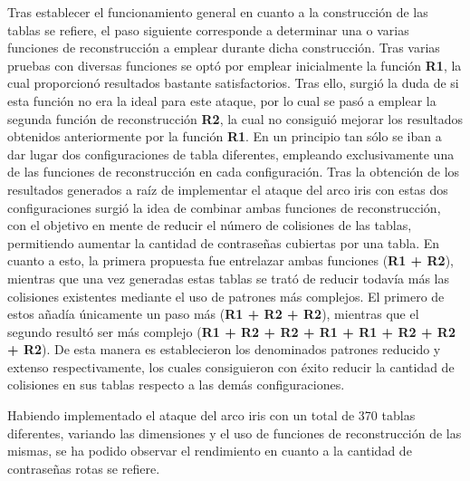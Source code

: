 \documentclass[12pt,spanish,listoffigures,listoftables]{tfgetsinf}
\begin{document}
Tras establecer el funcionamiento general en cuanto a la construcción de las tablas se refiere, el paso siguiente corresponde a determinar una o varias funciones de reconstrucción a emplear durante dicha construcción. Tras varias pruebas con diversas funciones se optó por emplear inicialmente la función \textbf{R1}, la cual proporcionó resultados bastante satisfactorios. Tras ello, surgió la duda de si esta función no era la ideal para este ataque, por lo cual se pasó a emplear la segunda función de reconstrucción \textbf{R2}, la cual no consiguió mejorar los resultados obtenidos anteriormente por la función \textbf{R1}. En un principio tan sólo se iban a dar lugar dos configuraciones de tabla diferentes, empleando exclusivamente una de las funciones de reconstrucción en cada configuración. Tras la obtención de los resultados generados a raíz de implementar el ataque del arco iris con estas dos configuraciones surgió la idea de combinar ambas funciones de reconstrucción, con el objetivo en mente de reducir el número de colisiones de las tablas, permitiendo aumentar la cantidad de contraseñas cubiertas por una tabla. En cuanto a esto, la primera propuesta fue entrelazar ambas funciones (\textbf{R1 + R2}), mientras que una vez generadas estas tablas se trató de reducir todavía más las colisiones existentes mediante el uso de patrones más complejos. El primero de estos añadía únicamente un paso más (\textbf{R1 + R2 + R2}), mientras que el segundo resultó ser más complejo (\textbf{R1 + R2 + R2 + R1 + R1 + R2 + R2 + R2}). De esta manera es establecieron los denominados patrones reducido y extenso respectivamente, los cuales consiguieron con éxito reducir la cantidad de colisiones en sus tablas respecto a las demás configuraciones.

Habiendo implementado el ataque del arco iris con un total de 370 tablas diferentes, variando las dimensiones y el uso de funciones de reconstrucción de las mismas, se ha podido observar el rendimiento en cuanto a la cantidad de contraseñas rotas se refiere.
\end{document}
